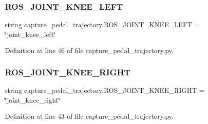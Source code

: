 \subsubsection{\texorpdfstring{ROS\_JOINT\_KNEE\_LEFT}{ROS\_JOINT\_KNEE\_LEFT}}
{\footnotesize\ttfamily string capture\+\_\+pedal\+\_\+trajectory.\+R\+O\+S\+\_\+\+J\+O\+I\+N\+T\+\_\+\+K\+N\+E\+E\+\_\+\+L\+E\+FT = \char`\"{}joint\+\_\+knee\+\_\+left\char`\"{}}



Definition at line 46 of file capture\+\_\+pedal\+\_\+trajectory.\+py.

\mbox{\label{namespacecapture__pedal__trajectory_a79c63fa5ca37fc7f030568dfe7079f73}} 
\subsubsection{\texorpdfstring{ROS\_JOINT\_KNEE\_RIGHT}{ROS\_JOINT\_KNEE\_RIGHT}}
{\footnotesize\ttfamily string capture\+\_\+pedal\+\_\+trajectory.\+R\+O\+S\+\_\+\+J\+O\+I\+N\+T\+\_\+\+K\+N\+E\+E\+\_\+\+R\+I\+G\+HT = \char`\"{}joint\+\_\+knee\+\_\+right\char`\"{}}



Definition at line 43 of file capture\+\_\+pedal\+\_\+trajectory.\+py.

